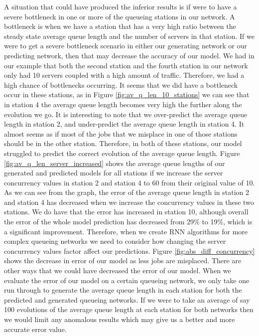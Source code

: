 \documentclass[a4paper,11pt,titlepage]{article}
\begin{document}
A situation that could have produced the inferior results is if were to have a severe bottleneck in one or more of the queueing stations in our network. A bottleneck is when we have a station that has a very high ratio between the steady state average queue length and the number of servers in that station. If we were to get a severe bottleneck scenario in either our generating network or our predicting network, then that may decrease the accuracy of our model. We had in our example that both the second station and the fourth station in our network only had 10 servers coupled with a high amount of traffic. Therefore, we had a high chance of bottlenecks occurring. It seems that we did have a bottleneck occur in these stations, as in Figure \ref{fig:av_q_len_10_stations} we can see that in station 4 the average queue length becomes very high the further along the evolution we go. It is interesting to note that we over-predict the average queue length in station 2, and under-predict the average queue length in station 4. It almost seems as if most of the jobs that we misplace in one of those stations should be in the other station. Therefore, in both of these stations, our model struggled to predict the correct evolution of the average queue length. Figure \ref{fig:av_q_len_server_increased} shows the average queue lengths of our generated and predicted models for all stations if we increase the server concurrency values in station 2 and station 4 to 60 from their original value of 10. \\

As we can see from the graph, the error of the average queue length in station 2 and station 4 has decreased when we increase the concurrency values in these two stations. We do have that the error has increased in station 10, although overall the error of the whole model prediction has decreased from 29\% to 19\%, which is a significant improvement. Therefore, when we create RNN algorithms for more complex queueing networks we need to consider how changing the server concurrency values factor affect our predictions. Figure \ref{fig:abs_diff_concurrency} shows the decrease in error of our model as less jobs are misplaced. There are other ways that we could have decreased the error of our model. When we evaluate the error of our model on a certain queueing network, we only take one run through to generate the average queue length in each station for both the predicted and generated queueing networks. If we were to take an average of say 100 evolutions of the average queue length at each station for both networks then we would limit any anomalous results which may give us a better and more accurate error value. \\
\end{document}
